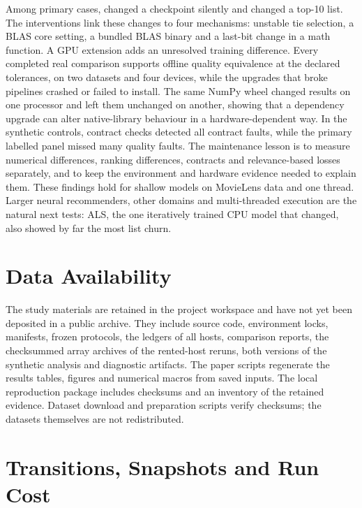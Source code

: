 \documentclass[11pt,a4paper]{article}
\begin{document}
Among \nCases{} primary cases, \nChanged{} changed a checkpoint silently and
\nListChanged{} changed a top-10 list. The interventions link these changes
to four mechanisms: unstable tie selection, a BLAS core setting, a bundled
BLAS binary and a last-bit
change in a math function. A GPU extension adds an unresolved training
difference. Every completed real comparison supports offline quality
equivalence at the declared tolerances, on two datasets and four devices,
while the upgrades that broke pipelines crashed or failed to install. The same
NumPy wheel changed results on one processor and left them unchanged on
another, showing that a dependency upgrade can alter native-library behaviour
in a hardware-dependent way. In the synthetic controls, contract checks
detected all contract faults, while the primary labelled panel missed
many quality faults. The maintenance lesson
is to measure numerical differences, ranking differences, contracts and
relevance-based losses separately, and to keep the environment and hardware
evidence needed to explain them. These findings hold for shallow models on
MovieLens data and one thread. Larger neural recommenders, other domains and
multi-threaded execution are the natural next tests: ALS, the one iteratively
trained CPU model that changed, also showed by far the most list churn.

\section*{Data Availability}
\label{sec:data-availability}

The study materials are retained in the project workspace and have not yet
been deposited in a public archive. They include source code, environment
locks, manifests, frozen protocols, the ledgers of all hosts, comparison
reports, the checksummed array archives of the rented-host reruns, both
versions of the synthetic analysis and diagnostic artifacts.
The paper scripts regenerate the results tables, figures and numerical
macros from saved inputs. The local reproduction package includes checksums
and an inventory of the retained evidence.
Dataset download and preparation scripts verify checksums; the datasets
themselves are not redistributed.

\appendix
\section{Transitions, Snapshots and Run Cost}
\end{document}
